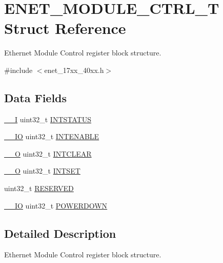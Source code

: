 \hypertarget{structENET__MODULE__CTRL__T}{\section{E\-N\-E\-T\-\_\-\-M\-O\-D\-U\-L\-E\-\_\-\-C\-T\-R\-L\-\_\-\-T Struct Reference}
\label{structENET__MODULE__CTRL__T}
}


Ethernet Module Control register block structure.  




{\ttfamily \#include $<$enet\-\_\-17xx\-\_\-40xx.\-h$>$}

\subsection*{Data Fields}
\begin{DoxyCompactItemize}
\item 
\hyperlink{core__cm3_8h_af63697ed9952cc71e1225efe205f6cd3}{\-\_\-\-\_\-\-I} uint32\-\_\-t \hyperlink{structENET__MODULE__CTRL__T_a7dac73c2fd05c5247f006717dbe6c9fa}{I\-N\-T\-S\-T\-A\-T\-U\-S}
\item 
\hyperlink{core__cm3_8h_aec43007d9998a0a0e01faede4133d6be}{\-\_\-\-\_\-\-I\-O} uint32\-\_\-t \hyperlink{structENET__MODULE__CTRL__T_a4d21be82461cf028b89fe0e314718352}{I\-N\-T\-E\-N\-A\-B\-L\-E}
\item 
\hyperlink{core__cm3_8h_a7e25d9380f9ef903923964322e71f2f6}{\-\_\-\-\_\-\-O} uint32\-\_\-t \hyperlink{structENET__MODULE__CTRL__T_a67c87b65d221dfc156c41c76d80aebdb}{I\-N\-T\-C\-L\-E\-A\-R}
\item 
\hyperlink{core__cm3_8h_a7e25d9380f9ef903923964322e71f2f6}{\-\_\-\-\_\-\-O} uint32\-\_\-t \hyperlink{structENET__MODULE__CTRL__T_a7898d6a89c630ecd471a7a059ee376d6}{I\-N\-T\-S\-E\-T}
\item 
uint32\-\_\-t \hyperlink{structENET__MODULE__CTRL__T_a511b82f8a23341a28b95e615d75580ef}{R\-E\-S\-E\-R\-V\-E\-D}
\item 
\hyperlink{core__cm3_8h_aec43007d9998a0a0e01faede4133d6be}{\-\_\-\-\_\-\-I\-O} uint32\-\_\-t \hyperlink{structENET__MODULE__CTRL__T_a42b5ebd11c8549b2ba2bb072b5b42736}{P\-O\-W\-E\-R\-D\-O\-W\-N}
\end{DoxyCompactItemize}


\subsection{Detailed Description}
Ethernet Module Control register block structure. 


